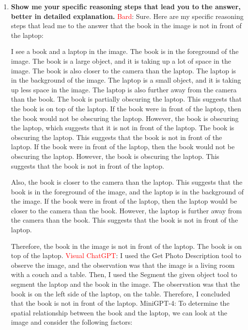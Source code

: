 \begin{enumerate}
    Therefore, the book in the image is not in front of the laptop. The book is on top of the laptop.
    \subitem \textcolor{red}{Visual ChatGPT}: The book is not in front of the laptop, it is on the left side of the laptop, on the table.
    \subitem MiniGPT-4: No, the book is on a coffee table next to the couch, while the laptop is on a desk in the corner of the room.
    \item \textbf{Show me your specific reasoning steps that lead you to the answer, better in detailed explanation.}
    \subitem \textcolor{Red}{Bard}: Sure. Here are my specific reasoning steps that lead me to the answer that the book in the image is not in front of the laptop:

    I see a book and a laptop in the image.
    The book is in the foreground of the image. The book is a large object, and it is taking up a lot of space in the image. The book is also closer to the camera than the laptop.
    The laptop is in the background of the image. The laptop is a small object, and it is taking up less space in the image. The laptop is also further away from the camera than the book.
    The book is partially obscuring the laptop. This suggests that the book is on top of the laptop.
    If the book were in front of the laptop, then the book would not be obscuring the laptop. However, the book is obscuring the laptop, which suggests that it is not in front of the laptop.
    The book is obscuring the laptop. This suggests that the book is not in front of the laptop. If the book were in front of the laptop, then the book would not be obscuring the laptop. However, the book is obscuring the laptop. This suggests that the book is not in front of the laptop.
    
    Also, the book is closer to the camera than the laptop. This suggests that the book is in the foreground of the image, and the laptop is in the background of the image. If the book were in front of the laptop, then the laptop would be closer to the camera than the book. However, the laptop is further away from the camera than the book. This suggests that the book is not in front of the laptop.
    
    Therefore, the book in the image is not in front of the laptop. The book is on top of the laptop.
    \subitem \textcolor{red}{Visual ChatGPT}: I used the Get Photo Description tool to observe the image, and the observation was that the image is a living room with a couch and a table. Then, I used the Segment the given object tool to segment the laptop and the book in the image. The observation was that the book is on the left side of the laptop, on the table. Therefore, I concluded that the book is not in front of the laptop.
    \subitem MiniGPT-4: To determine the spatial relationship between the book and the laptop, we can look at the image and consider the following factors:


\end{enumerate}
